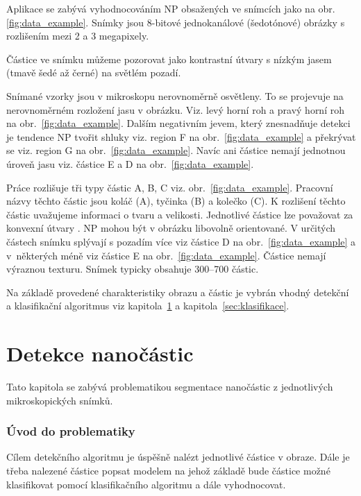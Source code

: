 \documentclass[11pt,twoside,a4paper,table]{book}
\begin{document}
Aplikace se zabývá vyhodnocováním NP obsažených ve snímcích jako na obr. \ref{fig:data_example}. Snímky jsou 8-bitové jednokanálové (šedotónové) obrázky s rozlišením mezi 2 a 3 megapixely.

Částice ve snímku můžeme pozorovat jako kontrastní útvary s nízkým jasem (tmavě šedé až černé) na světlém pozadí.

Snímané vzorky jsou v mikroskopu nerovnoměrně osvětleny. To se projevuje na nerovnoměrném rozložení jasu v obrázku. Viz. levý horní roh a pravý horní roh na obr.~\ref{fig:data_example}. Dalším negativním jevem, který znesnadňuje detekci je tendence NP tvořit shluky viz. region F na obr.~\ref{fig:data_example} a překrývat se viz. region G na obr.~\ref{fig:data_example}. Navíc ani částice nemají jednotnou úroveň jasu viz. částice E a D na obr.~\ref{fig:data_example}.

Práce rozlišuje tři typy částic A, B, C viz. obr.~\ref{fig:data_example}. Pracovní názvy těchto částic jsou koláč (A), tyčinka (B) a kolečko (C). K rozlišení těchto částic uvažujeme informaci o tvaru a velikosti. Jednotlivé částice lze považovat za konvexní útvary \cite{art:np_convex}. NP mohou být v obrázku libovolně orientované.  V určitých částech snímku splývají s pozadím více viz částice D na obr.~\ref{fig:data_example} a v~některých méně viz částice E na obr.~\ref{fig:data_example}. Částice nemají výraznou texturu. Snímek typicky obsahuje 300--700 částic.

Na základě provedené charakteristiky obrazu a částic je vybrán vhodný detekční a klasifikační algoritmus viz kapitola~\ref{sec:detekce} a kapitola~\ref{sec:klasifikace}.


\chapter{Detekce nanočástic}
\label{sec:detekce}
Tato kapitola se zabývá problematikou segmentace nanočástic z jednotlivých mikroskopických snímků.

\subsection{Úvod do problematiky}

Cílem detekčního algoritmu je úspěšně nalézt jednotlivé částice v obraze. Dále je třeba nalezené částice popsat modelem na jehož základě bude částice možné klasifikovat pomocí klasifikačního algoritmu a dále vyhodnocovat.
\end{document}
